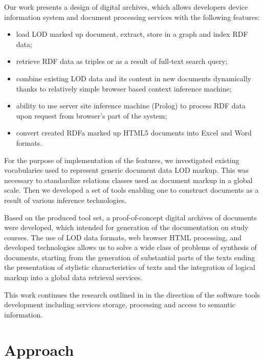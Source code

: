 \documentclass[conference,a4paper]{IEEEtran}
\begin{document}
Our work presents a design of digital archives, which allows
developers device information system and document processing services
with the following features:
\begin{itemize}
\item load LOD marked up document, extract, store in a graph and index RDF data;
\item retrieve RDF data as triples or as a result of full-text search query;
\item combine existing LOD data and its content in new documents dynamically
  thanks to relatively simple browser based context inference machine;
\item ability to use server site inference machine (Prolog) to process RDF data upon
  request from browser's part of the system;
\item convert created RDFa marked up HTML5 documents into Excel and Word formats.
\end{itemize}

For the purpose of implementation of the features, we investigated existing
vocabularies used to represent generic document data LOD markup.  This was necessary to standardize relations classes used as document markup in a global scale.  Then we developed a set of tools enabling one to construct documents as a result of various inference technologies.

Based on the produced tool set, a proof-of-concept digital archives of documents were developed, which intended for generation of the documentation on study courses.  The use of LOD data formats, web browser HTML processing, and developed technologies allows us to solve a wide class of problems of synthesis of documents, starting from the generation of substantial parts of the texts ending the presentation of stylistic characteristics of texts and the integration of logical markup into a global data retrieval services.

This work continues the research outlined in \cite{b2} in the direction of the software tools development including services storage, processing and access to semantic information.

\section{Approach}
\end{document}
